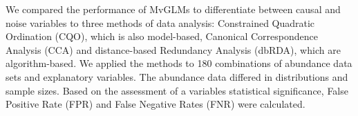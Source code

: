 
	
	We compared the performance of MvGLMs to differentiate between causal and noise variables to three methods of data analysis: 
	Constrained Quadratic Ordination (CQO), which is also model-based, Canonical Correspondence Analysis (CCA) and distance-based Redundancy Analysis (dbRDA), which are algorithm-based.
	We applied the methods to 180 combinations of abundance data sets and explanatory variables.
	The abundance data differed in distributions and sample sizes. 
    Based on the assessment of a variables statistical significance, False Positive Rate (FPR) and False Negative Rates (FNR) were calculated. 



	


